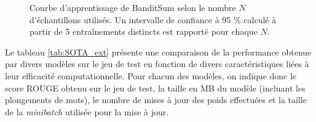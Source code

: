 \begin{figure}[h!]
\begin{center}
    \end{center}
    \caption{Courbe d'apprentissage de BanditSum selon le nombre $N$ d'échantillons utilisés.
             Un intervalle de confiance à 95 \% calculé à partir de 5 entraînements distincts
             est rapporté pour chaque $N$.}
    \label{fig:bs_learning_curve}
\end{figure}

Le tableau \ref{tab:SOTA_ext} présente une comparaison de la performance 
obtenue par divers modèles sur le jeu de test en fonction de divers 
caractéristiques liées à leur efficacité computationnelle.  
Pour chacun des modèles, on indique donc le score ROUGE 
obtenu sur le jeu de test, la taille en MB du modèle (incluant les 
plongements de mots), le nombre de mises à jour 
des poids effectuées et la taille de la \textit{minibatch} utilisée 
pour la mise à jour.


